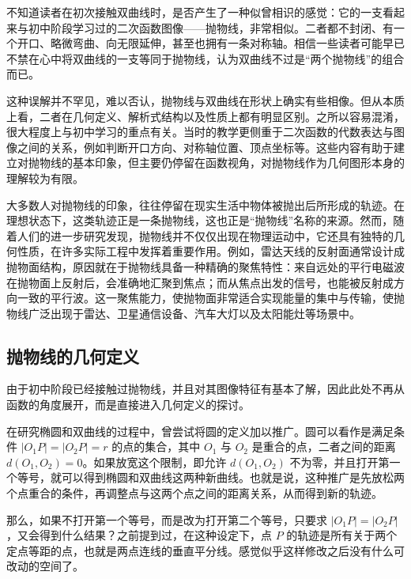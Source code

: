 
\begin{issues}
\issueDraft
\end{issues}


不知道读者在初次接触双曲线时，是否产生了一种似曾相识的感觉：它的一支看起来与初中阶段学习过的二次函数图像——抛物线，非常相似。二者都不封闭、有一个开口、略微弯曲、向无限延伸，甚至也拥有一条对称轴。相信一些读者可能早已不禁在心中将双曲线的一支等同于抛物线，认为双曲线不过是“两个抛物线”的组合而已。

这种误解并不罕见，难以否认，抛物线与双曲线在形状上确实有些相像。但从本质上看，二者在几何定义、解析式结构以及性质上都有明显区别。之所以容易混淆，很大程度上与初中学习的重点有关。当时的教学更侧重于二次函数的代数表达与图像之间的关系，例如判断开口方向、对称轴位置、顶点坐标等。这些内容有助于建立对抛物线的基本印象，但主要仍停留在函数视角，对抛物线作为几何图形本身的理解较为有限。

大多数人对抛物线的印象，往往停留在现实生活中物体被抛出后所形成的轨迹。在理想状态下，这类轨迹正是一条抛物线，这也正是“抛物线”名称的来源。然而，随着人们的进一步研究发现，抛物线并不仅仅出现在物理运动中，它还具有独特的几何性质，在许多实际工程中发挥着重要作用。例如，雷达天线的反射面通常设计成抛物面结构，原因就在于抛物线具备一种精确的聚焦特性：来自远处的平行电磁波在抛物面上反射后，会准确地汇聚到焦点；而从焦点出发的信号，也能被反射成方向一致的平行波。这一聚焦能力，使抛物面非常适合实现能量的集中与传输，使抛物线广泛出现于雷达、卫星通信设备、汽车大灯以及太阳能灶等场景中。

\subsection{抛物线的几何定义}

由于初中阶段已经接触过抛物线，并且对其图像特征有基本了解，因此此处不再从函数的角度展开，而是直接进入几何定义的探讨。

在研究椭圆和双曲线的过程中，曾尝试将圆的定义加以推广。圆可以看作是满足条件 $|O_1P| = |O_2P| = r$ 的点的集合，其中 $O_1$ 与 $O_2$ 是重合的点，二者之间的距离 $d(O_1,O_2)=0$。如果放宽这个限制，即允许 $d(O_1,O_2)$ 不为零，并且打开第一个等号，就可以得到椭圆和双曲线这两种新曲线。也就是说，这种推广是先放松两个点重合的条件，再调整点与这两个点之间的距离关系，从而得到新的轨迹。

那么，如果不打开第一个等号，而是改为打开第二个等号，只要求 $|O_1P| = |O_2P|$，又会得到什么结果？之前提到过，在这种设定下，点 $P$ 的轨迹是所有关于两个定点等距的点，也就是两点连线的垂直平分线。感觉似乎这样修改之后没有什么可改动的空间了。

